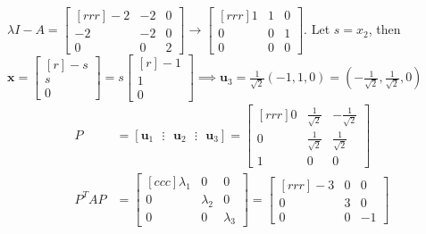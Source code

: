 \documentclass{article}
\newcommand\ddfrac[2]{\frac{\displaystyle #1}{\displaystyle #2}}
\begin{document}
    $ \lambda I - A = \begin{bmatrix}[rrr]
        -2 & -2 & 0 \\
        -2 & -2 & 0 \\
        0 & 0 & 2 
    \end{bmatrix} \to \begin{bmatrix}[rrr]
        1 & 1 & 0 \\
        0 & 0 & 1 \\
        0 & 0 & 0 
    \end{bmatrix}.$ Let $s = x_2$, then $ \textbf{x} = \begin{bmatrix}[r]
        -s \\
        s \\
        0 
    \end{bmatrix} = s \begin{bmatrix}[r]
        -1 \\
        1 \\ 
        0 
    \end{bmatrix} \implies \textbf{u}_3 = \ddfrac{1}{\sqrt{2}} (-1,1,0) = \left( - \ddfrac{1}{\sqrt{2}} ,
    \ddfrac{1}{\sqrt{2}} , 0\right)$ 
     \begin{equation*}
        \begin{split}
            P &= [ \textbf{u}_1\text{ } \vdots \text{ }\textbf{u}_2 \text{  } \vdots \text{  }\textbf{u}_3 ] =  \begin{bmatrix}[rrr]
        0 & \frac{1}{\sqrt{2}} & - \frac{1}{\sqrt{2}} \\
        0 & \frac{1}{\sqrt{2}}& \frac{1}{\sqrt{2}} \\
        1 & 0 & 0 
    \end{bmatrix} \\
                P^TAP &= \begin{bmatrix}[ccc]
                    \lambda _1 & 0 & 0 \\
                    0 & \lambda _2 & 0 \\
                    0 & 0 & \lambda _3 
                \end{bmatrix}  =  \begin{bmatrix}[rrr]
                    -3 & 0 & 0 \\
                    0 & 3 & 0 \\
                    0 & 0 & -1 
                \end{bmatrix} 
        \end{split}
    \end{equation*}
\end{document}
